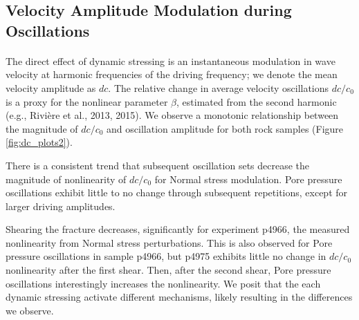 \clearpage

\subsection{Velocity Amplitude Modulation during Oscillations}
\paragraph{}
The direct effect of dynamic stressing is an instantaneous modulation in wave velocity at harmonic frequencies of the driving frequency; we denote the mean velocity amplitude as $ dc $. The relative change in average velocity oscillations $ dc/c_0 $ is a proxy for the nonlinear parameter $ \beta $, estimated from the second harmonic (e.g., Rivière et al., 2013, 2015). We observe a monotonic relationship between the magnitude of $ dc/c_0 $ and oscillation amplitude for both rock samples (Figure \ref{fig:dc_plots2}). 

There is a consistent trend that subsequent oscillation sets decrease the magnitude of nonlinearity of $ dc/c_0 $ for Normal stress modulation. Pore pressure oscillations exhibit little to no change through subsequent repetitions, except for larger driving amplitudes.  

Shearing the fracture decreases, significantly for experiment p4966, the measured nonlinearity from Normal stress perturbations. This is also observed for Pore pressure oscillations in sample p4966, but p4975 exhibits little no change in $ dc/c_0 $ nonlinearity after the first shear. Then, after the second shear, Pore pressure oscillations interestingly increases the nonlinearity. We posit that the each dynamic stressing activate different mechanisms, likely resulting in the differences we observe. 



